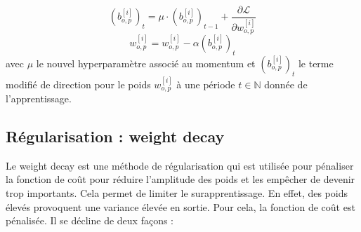 \documentclass[12pt,english, openany]{book}
\begin{document}
$$
(b^{[i]}_{o,p})_t = \mu \cdot (b^{[i]}_{o,p})_{t-1} + \frac{\partial \mathcal{L}}{\partial w^{[i]}_{o,p}}
$$ 
$$
w^{[i]}_{o,p} = w^{[i]}_{o,p} - \alpha (b^{[i]}_{o,p})_t
$$
avec $\mu$ le nouvel hyperparamètre associé au momentum et $(b^{[i]}_{o,p})_t$ le terme modifié de direction pour le poids $w^{[i]}_{o,p}$ à une période $t\in \mathbb{N}$ donnée de l'apprentissage.



\subsection{Régularisation : weight decay}
\label{subsec:regularisation}
Le weight decay est une méthode de régularisation qui est utilisée pour pénaliser la fonction de coût pour réduire l’amplitude des poids et les empêcher de devenir trop importants. Cela permet de limiter le surapprentissage. En effet, des poids élevés provoquent une variance élevée en sortie. Pour cela, la fonction de coût est pénalisée. Il se décline de deux façons :\\
\end{document}
